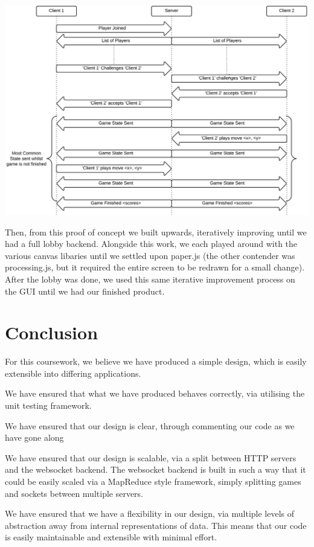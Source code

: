 \documentclass[a4wide, 11pt]{article}
\begin{document}
\includegraphics[width=\textwidth]{ConnectionFlowchart.png}

Then, from this proof of concept we built upwards, iteratively improving until we had a full lobby backend. Alongside this work, we each played around with the various canvas libaries until we settled upon paper.js (the other contender was processing.js, but it required the entire screen to be redrawn for a small change). After the lobby was done, we used this same iterative improvement process on the GUI until we had our finished product.

\section{Conclusion}

For this coursework, we believe we have produced a simple design, which is easily extensible into differing applications.

We have ensured that what we have produced behaves correctly, via utilising the unit testing framework. 

We have ensured that our design is clear, through commenting our code as we have gone along

We have ensured that our design is scalable, via a split between HTTP servers and the websocket backend. The websocket backend is built in such a way that it could be easily scaled via a MapReduce style framework, simply splitting games and sockets between multiple servers.

We have ensured that we have a flexibility in our design, via multiple levels of abstraction away from internal representations of data. This means that our code is easily maintainable and extensible with minimal effort.
\end{document}
